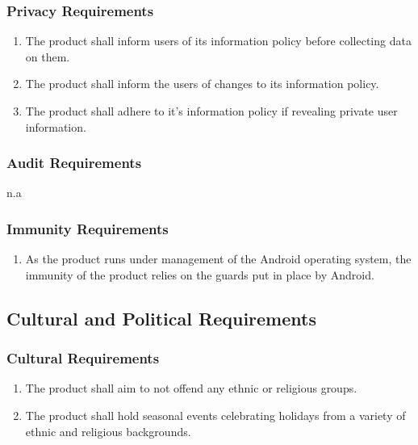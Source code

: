 \documentclass[]{article}
\begin{document}
\subsubsection{Privacy Requirements}
\label{ssub:privacy_requirements}
\begin{enumerate}[{SR}1. ]
	\resumeEnum
	\item The product shall inform users of its information policy before collecting data on them.
	\item The product shall inform the users of changes to its information policy.
	\item The product shall adhere to it's information policy if revealing private user information.
	\holdEnum
\end{enumerate}

\subsubsection{Audit Requirements}
\label{ssub:audit_requirements}
n.a

\subsubsection{Immunity Requirements}
\label{ssub:immunity_requirements}

\begin{enumerate}[{SR}1. ]
	\resumeEnum
	\item As the product runs under management of the Android operating system, the immunity of the product relies on the guards put in place by Android.
\end{enumerate}


\subsection{Cultural and Political Requirements}
\label{sub:cultural_and_political_requirements}

\subsubsection{Cultural Requirements}
\label{ssub:cultural_requirements}
\begin{enumerate}[{CP}1. ]
	\item The product shall aim to not offend any ethnic or religious groups.
	\item The product shall hold seasonal events celebrating holidays from a variety of ethnic and religious backgrounds.
	\holdEnum
\end{enumerate}
\end{document}
